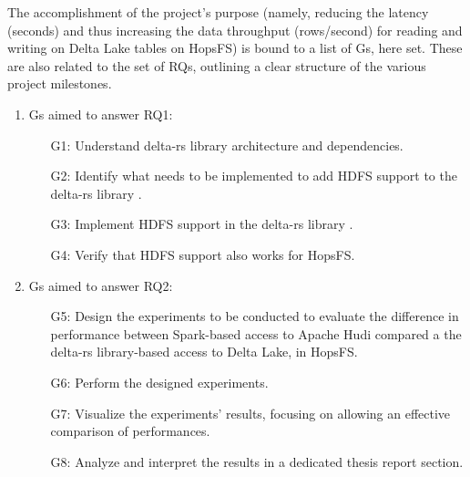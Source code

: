 The accomplishment of the project's purpose (namely, reducing the latency (seconds) and thus increasing the data throughput (rows/second) for reading and writing on Delta Lake tables on \gls{HopsFS}) is bound to a list of \glspl{G}, here set. These are also related to the set of \glspl{RQ}, outlining a clear structure of the various project milestones.

\begin{enumerate}
    \item \glspl{G} aimed to answer RQ1: 
        \begin{enumerate}
            \item[G1:] Understand delta-rs library \cite{DeltaioDeltars2024} architecture and dependencies.
            \item[G2:] Identify what needs to be implemented to add \gls{HDFS} support to the delta-rs library \cite{DeltaioDeltars2024}.  
            \item[G3:] Implement \gls{HDFS} support in the delta-rs library \cite{DeltaioDeltars2024}.
            \item[G4:] Verify that \gls{HDFS} support also works for \gls{HopsFS}.
        \end{enumerate}
    \item \glspl{G} aimed to answer RQ2:
        \begin{enumerate}
            \item[G5:] Design the experiments to be conducted to evaluate the difference in performance between Spark-based access to Apache Hudi compared a the delta-rs \cite{DeltaioDeltars2024} library-based access to Delta Lake, in \gls{HopsFS}. 
            \item[G6:] Perform the designed experiments.
            \item[G7:] Visualize the experiments' results, focusing on allowing an effective comparison of performances.
            \item[G8:] Analyze and interpret the results in a dedicated thesis report section.
        \end{enumerate}
\end{enumerate}

